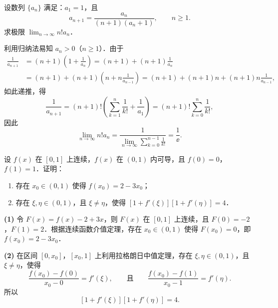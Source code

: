 设数列 $\{a_n\}$ 满足：$a_1=1$，且
\[
  a_{n+1}=\frac{a_n}{(n+1)(a_n+1)},\qquad n\ge 1.
\]
求极限 $\displaystyle \lim_{n\to\infty}n!a_n$．
\begin{solution}
利用归纳法易知 $a_n>0$（$n\ge1$）．由于
\begin{align*}
\frac{1}{a_{n+1}}
&=(n+1)\left(1+\frac{1}{a_n}\right)
=(n+1)+(n+1)\frac{1}{a_n}\\
&=(n+1)+(n+1)\left(n+n\frac{1}{a_{n-1}}\right)
=(n+1)+(n+1)n+(n+1)n\frac{1}{a_{n-1}},
\end{align*}
如此递推，得
\[
  \frac{1}{a_{n+1}}=(n+1)!\left(\sum_{k=1}^{n}\frac{1}{k!}+\frac{1}{a_1}\right)
  =(n+1)!\sum_{k=0}^{n}\frac{1}{k!},
\]
因此
\[
  \lim_{n\to\infty}n!a_n
  =\frac{1}{\lim\limits_{n\to\infty}\sum\limits_{k=0}^{n-1}\frac{1}{k!}}
  =\frac{1}{\ee}.
\]
\end{solution}

设 $f(x)$ 在 $[0,1]$ 上连续，$f(x)$ 在 $(0,1)$ 内可导，且 $f(0)=0$，$f(1)=1$．证明：
\begin{enumerate}
  \item 存在 $x_0\in(0,1)$ 使得 $f(x_0)=2-3x_0$；
  \item 存在 $\xi,\eta\in(0,1)$，且 $\xi\neq\eta$，使得 $[1+f'(\xi)][1+f'(\eta)]=4$．
\end{enumerate}
\begin{solution}
\textbf{(1)} 令 $F(x)=f(x)-2+3x$，则 $F(x)$ 在 $[0,1]$ 上连续，且 $F(0)=-2$，$F(1)=2$．根据连续函数介值定理，存在 $x_0\in(0,1)$ 使得 $F(x_0)=0$，即 $f(x_0)=2-3x_0$．

\textbf{(2)} 在区间 $[0,x_0]$，$[x_0,1]$ 上利用拉格朗日中值定理，存在 $\xi,\eta\in(0,1)$，且 $\xi\neq\eta$，使得
\[
  \frac{f(x_0)-f(0)}{x_0-0}=f'(\xi),\qquad\text{且}\qquad
  \frac{f(x_0)-f(1)}{x_0-1}=f'(\eta).
\]
所以
\[
  [1+f'(\xi)][1+f'(\eta)]=4.
\]
\end{solution}

